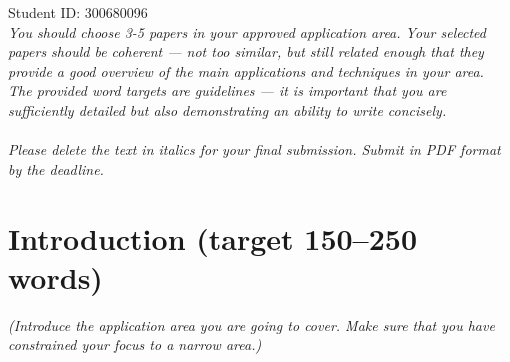\documentclass{article}[11pt]
\begin{document}
\noindent Student ID: 300680096 \\
\noindent \textit{You should choose 3-5 papers in your approved application area. Your selected papers should be coherent --- not too similar, but still related enough that they provide a good overview of the main applications and techniques in your area. The provided word targets are guidelines --- it is important that you are sufficiently detailed but also demonstrating an ability to write concisely.\\ \\
Please delete the text in italics for your final submission. Submit in PDF format by the deadline.
}

\section*{Introduction (target 150--250 words)}
\begin{mdframed}[] %
\textit{(Introduce the application area you are going to cover. Make sure that you have constrained your focus to a narrow area.)}
\end{mdframed}
\end{document}

